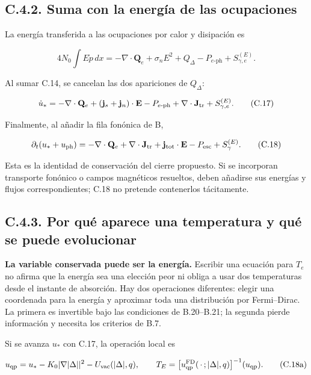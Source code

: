 \documentclass[
  spanish,
  10pt,
  a4paper,
]{article}
\begin{document}
\subsection{C.4.2. Suma con la energía de las
ocupaciones}\label{c.4.2.-suma-con-la-energuxeda-de-las-ocupaciones}

La energía transferida a las ocupaciones por calor y disipación es

\[
4N_0\int E\dot p\,dx=-\nabla\cdot\mathbf Q_e
+\sigma_n E^2+Q_\Delta-P_{e\text{-ph}}+S_{\gamma,e}^{(E)}.
\tag{C.16}
\]

Al sumar C.14, se cancelan las dos apariciones de \(Q_\Delta\):

\[
\dot u_*=-\nabla\cdot\mathbf Q_e
+(\mathbf j_s+\mathbf j_n)\cdot\mathbf E
-P_{e\text{-ph}}+\nabla\cdot\mathbf J_{\rm tr}
+S_{\gamma,e}^{(E)}. \tag{C.17}
\]

Finalmente, al añadir la fila fonónica de B,

\[
\partial_t(u_*+u_{\rm ph})=
-\nabla\cdot\mathbf Q_e+\nabla\cdot\mathbf J_{\rm tr}
+\mathbf j_{\rm tot}\cdot\mathbf E-P_{\rm esc}+S_\gamma^{(E)}.
\tag{C.18}
\]

Esta es la identidad de conservación del cierre propuesto. Si se
incorporan transporte fonónico o campos magnéticos resueltos, deben
añadirse sus energías y flujos correspondientes; C.18 no pretende
contenerlos tácitamente.

\subsection{C.4.3. Por qué aparece una temperatura y qué se puede
evolucionar}\label{c.4.3.-por-quuxe9-aparece-una-temperatura-y-quuxe9-se-puede-evolucionar}

\textbf{La variable conservada puede ser la energía.} Escribir una
ecuación para \(T_e\) no afirma que la energía sea una elección peor ni
obliga a usar dos temperaturas desde el instante de absorción. Hay dos
operaciones diferentes: elegir una coordenada para la energía y
aproximar toda una distribución por Fermi--Dirac. La primera es
invertible bajo las condiciones de B.20--B.21; la segunda pierde
información y necesita los criterios de B.7.


Si se avanza \(u_*\) con C.17, la operación local es

\[
u_{\rm qp}=u_*-K_0|\nabla|\Delta||^2-U_{\rm vac}(|\Delta|,q),
\qquad
T_E=\big[u_{\rm qp}^{\rm FD}(\,\cdot\,;|\Delta|,q)\big]^{-1}(u_{\rm qp}).
\tag{C.18a}
\]
\end{document}
